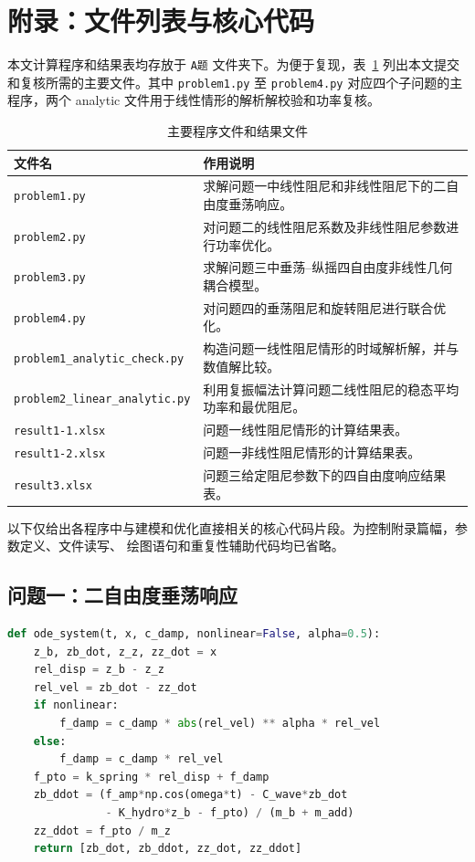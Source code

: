 \section{附录：文件列表与核心代码}

本文计算程序和结果表均存放于 \texttt{A题} 文件夹下。为便于复现，表~\ref{tab:appendix_files}
列出本文提交和复核所需的主要文件。其中 \texttt{problem1.py} 至 \texttt{problem4.py}
对应四个子问题的主程序，两个 analytic 文件用于线性情形的解析解校验和功率复核。

\begin{table}[H]
  \centering
  \caption{主要程序文件和结果文件}
  \label{tab:appendix_files}
  \small
  \begin{tabular}{p{}p{}}
    \toprule
    文件名 & 作用说明 \\
    \midrule
    \texttt{problem1.py} & 求解问题一中线性阻尼和非线性阻尼下的二自由度垂荡响应。\\
    \texttt{problem2.py} & 对问题二的线性阻尼系数及非线性阻尼参数进行功率优化。\\
    \texttt{problem3.py} & 求解问题三中垂荡--纵摇四自由度非线性几何耦合模型。\\
    \texttt{problem4.py} & 对问题四的垂荡阻尼和旋转阻尼进行联合优化。\\
    \texttt{problem1\_analytic\_check.py} & 构造问题一线性阻尼情形的时域解析解，并与数值解比较。\\
    \texttt{problem2\_linear\_analytic.py} & 利用复振幅法计算问题二线性阻尼的稳态平均功率和最优阻尼。\\
    \texttt{result1-1.xlsx} & 问题一线性阻尼情形的计算结果表。\\
    \texttt{result1-2.xlsx} & 问题一非线性阻尼情形的计算结果表。\\
    \texttt{result3.xlsx} & 问题三给定阻尼参数下的四自由度响应结果表。\\
    \bottomrule
  \end{tabular}
\end{table}

以下仅给出各程序中与建模和优化直接相关的核心代码片段。为控制附录篇幅，参数定义、文件读写、
绘图语句和重复性辅助代码均已省略。

\subsection{问题一：二自由度垂荡响应}

\begin{lstlisting}[language=Python,caption={问题一垂荡运动方程与数值积分核心片段}]
def ode_system(t, x, c_damp, nonlinear=False, alpha=0.5):
    z_b, zb_dot, z_z, zz_dot = x
    rel_disp = z_b - z_z
    rel_vel = zb_dot - zz_dot
    if nonlinear:
        f_damp = c_damp * abs(rel_vel) ** alpha * rel_vel
    else:
        f_damp = c_damp * rel_vel
    f_pto = k_spring * rel_disp + f_damp
    zb_ddot = (f_amp*np.cos(omega*t) - C_wave*zb_dot
               - K_hydro*z_b - f_pto) / (m_b + m_add)
    zz_ddot = f_pto / m_z
    return [zb_dot, zb_ddot, zz_dot, zz_ddot]
\end{lstlisting}

